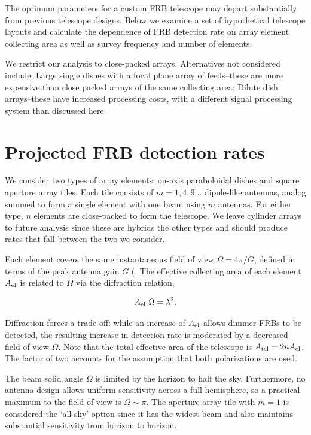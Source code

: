 \documentclass[fleqn,usenatbib]{mnras}
\begin{document}
The optimum parameters for a custom FRB telescope may depart substantially from previous telescope designs.  Below we examine a set of hypothetical telescope layouts and calculate the dependence of FRB detection rate on array element collecting area as well as survey frequency and number of elements. 

We restrict our analysis to close-packed arrays. Alternatives not considered include: Large single dishes with a focal plane array of feeds--these are more expensive than close packed arrays of the same collecting area; Dilute dish arrays--these have increased processing costs, with a different signal processing system than discussed here.  
 
\section{Projected FRB detection rates}

We consider two types of array elements: on-axis paraboloidal dishes and square aperture array tiles.  Each tile consists of $m=1, 4, 9 ...$ dipole-like antennas, analog summed to form a single element with one beam using $m$ antennas. For either type, $n$ elements are close-packed to form the telescope. We leave cylinder arrays \citep{chimesystem} to future analysis since these are hybrids the other types and should produce rates that fall between the two we consider.


Each element covers the same instantaneous field of view $\Omega=4\pi/G$, defined in terms of the peak antenna gain $G$ (\cite{era}. The effective collecting area of each element $A_{\rm{el}}$ is related to $\Omega$ via the diffraction relation, 

\begin{equation}
		A_{\rm{el}} ~\Omega =\lambda^2.
\end{equation}

Diffraction forces a trade-off: while an increase of $A_{\rm{el}}$ allows dimmer FRBs to be detected, the resulting increase in detection rate is moderated by a decreased field of view $\Omega$. Note that the total effective area of the telescope is $ A_{\rm{tel}}= 2 n A_{\rm{el}}$. The factor of two accounts for the assumption that both polarizations are used.

The beam solid angle $\Omega$ is limited by the horizon to half the sky. Furthermore, no antenna design allows uniform sensitivity across a full hemisphere, so a practical maximum to the field of view is  $\Omega \sim \pi$. The aperture array tile with $m=1$ is considered the `all-sky' option since it has the widest beam and also maintains substantial sensitivity from horizon to horizon.
\end{document}
